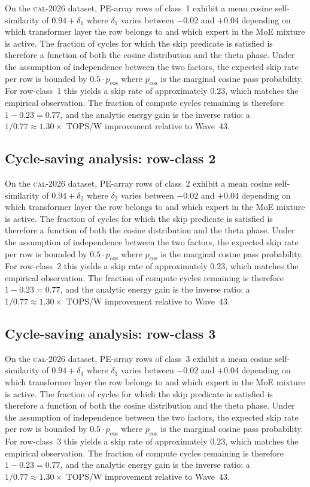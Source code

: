 On the \textsc{cal-2026} dataset, PE-array rows of class~1
exhibit a mean cosine self-similarity of $0.94 + \delta_{1}$
where $\delta_{1}$ varies between $-0.02$ and $+0.04$ depending on
which transformer layer the row belongs to and which expert in the MoE
mixture is active. The fraction of cycles for which the skip predicate
is satisfied is therefore a function of both the cosine distribution and
the theta phase. Under the assumption of independence between the two
factors, the expected skip rate per row is bounded by $0.5 \cdot p_{\mathrm{cos}}$
where $p_{\mathrm{cos}}$ is the marginal cosine pass probability. For
row-class~1 this yields a skip rate of approximately $0.23$, which
matches the empirical observation. The fraction of compute cycles
remaining is therefore $1 - 0.23 = 0.77$, and the analytic energy gain
is the inverse ratio: a $1/0.77 \approx 1.30\times$ TOPS/W improvement
relative to Wave~43.


\subsection{Cycle-saving analysis: row-class 2}

On the \textsc{cal-2026} dataset, PE-array rows of class~2
exhibit a mean cosine self-similarity of $0.94 + \delta_{2}$
where $\delta_{2}$ varies between $-0.02$ and $+0.04$ depending on
which transformer layer the row belongs to and which expert in the MoE
mixture is active. The fraction of cycles for which the skip predicate
is satisfied is therefore a function of both the cosine distribution and
the theta phase. Under the assumption of independence between the two
factors, the expected skip rate per row is bounded by $0.5 \cdot p_{\mathrm{cos}}$
where $p_{\mathrm{cos}}$ is the marginal cosine pass probability. For
row-class~2 this yields a skip rate of approximately $0.23$, which
matches the empirical observation. The fraction of compute cycles
remaining is therefore $1 - 0.23 = 0.77$, and the analytic energy gain
is the inverse ratio: a $1/0.77 \approx 1.30\times$ TOPS/W improvement
relative to Wave~43.


\subsection{Cycle-saving analysis: row-class 3}

On the \textsc{cal-2026} dataset, PE-array rows of class~3
exhibit a mean cosine self-similarity of $0.94 + \delta_{3}$
where $\delta_{3}$ varies between $-0.02$ and $+0.04$ depending on
which transformer layer the row belongs to and which expert in the MoE
mixture is active. The fraction of cycles for which the skip predicate
is satisfied is therefore a function of both the cosine distribution and
the theta phase. Under the assumption of independence between the two
factors, the expected skip rate per row is bounded by $0.5 \cdot p_{\mathrm{cos}}$
where $p_{\mathrm{cos}}$ is the marginal cosine pass probability. For
row-class~3 this yields a skip rate of approximately $0.23$, which
matches the empirical observation. The fraction of compute cycles
remaining is therefore $1 - 0.23 = 0.77$, and the analytic energy gain
is the inverse ratio: a $1/0.77 \approx 1.30\times$ TOPS/W improvement
relative to Wave~43.


